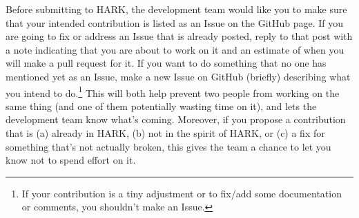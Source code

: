 \documentclass[12pt,titlepage,letterpaper]{econtex}
\begin{document}
Before submitting to HARK, the development team would like you to make sure that your intended contribution is listed as an Issue on the GitHub page.  If you are going to fix or address an Issue that is already posted, reply to that post with a note indicating that you are about to work on it and an estimate of when you will make a pull request for it.  If you want to do something that no one has mentioned yet as an Issue, make a new Issue on GitHub (briefly) describing what you intend to do.\footnote{If your contribution is a tiny adjustment or to fix/add some documentation or comments, you shouldn't make an Issue.}  This will both help prevent two people from working on the same thing (and one of them potentially wasting time on it), and lets the development team know what's coming.  Moreover, if you propose a contribution that is (a) already in HARK, (b) not in the spirit of HARK, or (c) a fix for something that's not actually broken, this gives the team a chance to let you know not to spend effort on it.
\end{document}
